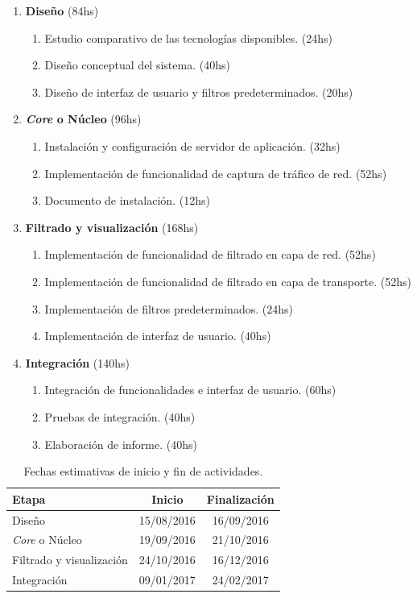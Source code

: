 \begin{enumerate}
	\item \textbf{Diseño} (84hs)
	\begin{enumerate}
		\item Estudio comparativo de las tecnologías disponibles. (24hs)
		\item Diseño conceptual del sistema. (40hs)
		\item Diseño de interfaz de usuario y filtros predeterminados. (20hs)
	\end{enumerate}
	\item \textbf{\textit{Core} o Núcleo} (96hs)
	\begin{enumerate}
		\item Instalación y configuración de servidor de aplicación. (32hs)
		\item Implementación de funcionalidad de captura de tráfico de red. (52hs)
		\item Documento de instalación. (12hs)
	\end{enumerate}
	\item \textbf{Filtrado y visualización} (168hs)
	\begin{enumerate}
		\item Implementación de funcionalidad de filtrado en capa de red. (52hs)
		\item Implementación de funcionalidad de filtrado en capa de transporte. (52hs)
		\item Implementación de filtros predeterminados. (24hs)
		\item Implementación de interfaz de usuario. (40hs)
	\end{enumerate}
	\item \textbf{Integración} (140hs)
	\begin{enumerate}
		\item Integración de funcionalidades e interfaz de usuario. (60hs)
		\item Pruebas de integración. (40hs)
		\item Elaboración de informe. (40hs)
	\end{enumerate}
\end{enumerate}

\begin{table}[bp]
	\begin{center}	
		\begin{tabular}{|l|c|c|}
			\hline 
			Etapa & Inicio & Finalización \\ \hline
			Diseño & 15/08/2016 & 16/09/2016 \\
			\textit{Core} o Núcleo & 19/09/2016 & 21/10/2016 \\
			Filtrado y visualización & 24/10/2016 & 16/12/2016 \\
			Integración & 09/01/2017 & 24/02/2017 \\ \hline
		\end{tabular}
	\end{center}
	\caption{Fechas estimativas de inicio y fin de actividades.}
	\label{table:cronograma}
\end{table}





